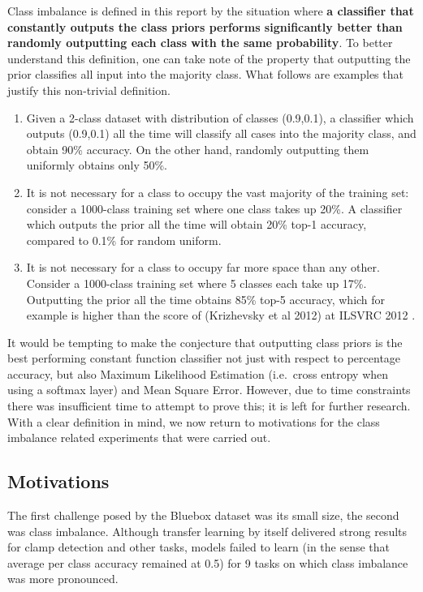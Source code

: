 \documentclass[a4paper,11pt]{article}
\begin{document}
Class imbalance is defined in this report by the situation where \textbf{a classifier that constantly outputs the class priors performs significantly better than randomly outputting each class with the same probability}. To better understand this definition, one can take note of the property that outputting the prior classifies all input into the majority class. What follows are examples that justify this non-trivial definition.

\begin{enumerate}
\item Given a 2-class dataset with distribution of classes (0.9,0.1), a classifier which outputs (0.9,0.1) all the time will classify all cases into the majority class, and obtain 90\% accuracy. On the other hand, randomly outputting them uniformly obtains only 50\%. 
\item It is not necessary for a class to occupy the vast majority of the training set: consider a 1000-class training set where one class takes up 20\%. A classifier which outputs the prior all the time will obtain 20\% top-1 accuracy, compared to 0.1\% for random uniform. 
\item It is not necessary for a class to occupy far more space than any other. Consider a 1000-class training set where 5 classes each take up 17\%. Outputting the prior all the time obtains 85\% top-5 accuracy, which for example is higher than the score of (Krizhevsky et al 2012) at ILSVRC 2012 \cite{krizhevsky}.
\end{enumerate} 

It would be tempting to make the conjecture that outputting class priors is the best performing constant function classifier not just with respect to percentage accuracy, but also Maximum Likelihood Estimation (i.e.\ cross entropy when using a softmax layer) and Mean Square Error. However, due to time constraints there was insufficient time to attempt to prove this; it is left for further research. \\

With a clear definition in mind, we now return to motivations for the class imbalance related experiments that were carried out. \\

\subsection{Motivations}

The first challenge posed by the Bluebox dataset was its small size, the second was class imbalance. Although transfer learning by itself delivered strong results for clamp detection and other tasks, models failed to learn (in the sense that average per class accuracy remained at 0.5) for 9 tasks on which class imbalance was more pronounced. \\
\end{document}
